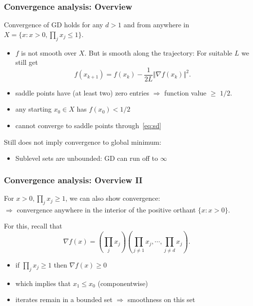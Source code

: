 \documentclass[aspectratio=149]{beamer}
\begin{document}
\begin{frame}
  \frametitle{Convergence analysis: Overview}
  Convergence of GD holds for any $d>1$ and from anywhere in $X=\{x: x> 0, \prod_j x_j \le 1\}$.
  \begin{itemize}
    \item $f$ is not smooth over $X$.
          But is smooth along the trajectory: For suitable $L$ we still get
          \begin{equation}\tag{SD}
            \label{eq:sd}
            f(x_{k+1}) = f(x_k) - \frac{1}{2L} \Vert \nabla f(x_k) \Vert^2.
          \end{equation}
    \item saddle points have (at least two) zero entries $\Rightarrow$ function value $\ge$ $1/2$.
    \item any starting $x_0 \in X$ has $f(x_0) < 1/2$
    \item cannot converge to saddle points through~\eqref{eq:sd}
  \end{itemize}

  Still does not imply convergence to global minimum:
  \begin{itemize}
    \item Sublevel sets are unbounded: GD can run off to $\infty$
  \end{itemize}

\end{frame}


\begin{frame}
  \frametitle{Convergence analysis: Overview II}

  For $x> 0, \prod_j x_j \ge 1$, we can also show convergence: \\
  $\Rightarrow$ convergence anywhere in the interior of the positive orthant $\{x: x> 0\}$.

  For this, recall that
  \begin{equation}
    \nabla f(x) = \left( \prod_j x_j \right) \left( \prod_{j\neq1} x_j, \cdots, \prod_{j\neq d}x_j \right).
  \end{equation}

  \begin{itemize}
    \item if $\prod_j x_j \ge 1$ then $\nabla f(x) \ge 0$
    \item which implies that $x_{1} \le x_0$ (componentwise)
    \item iterates remain in a bounded set $\Rightarrow$ smoothness on this set
  \end{itemize}

\end{frame}
\end{document}

